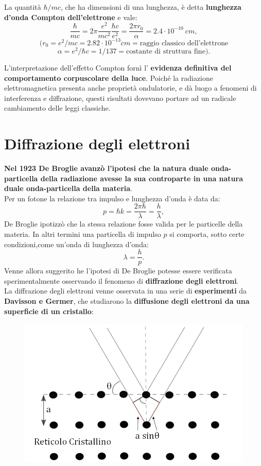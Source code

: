 La quantità $\hbar/ mc$, che ha dimensioni di una lunghezza, è detta \textbf{lunghezza d'onda Compton dell'elettrone} e vale:
\[
\frac{\hbar}{mc}= 2\pi \frac{e^2}{mc^2}\frac{\hbar c}{e^2}= \frac{2\pi r_0}{\alpha}= 2.4 \cdot 10^{-10} \ cm,
\]
\[(r_0 = e^2/mc = 2.82 \cdot 10^{-13} cm = \textrm{raggio classico dell'elettrone}\]
\[\alpha = e^2/\hbar c = 1/137 = \textrm{costante di struttura fine}).\]

L'interpretazione dell'effetto Compton fornì l' \textbf{evidenza definitiva del comportamento corpuscolare della luce}. Poiché la radiazione elettromagnetica presenta anche proprietà ondulatorie, e dà luogo a fenomeni di interferenza e diffrazione, questi risultati dovevano portare ad un radicale cambiamento delle leggi classiche.
\section{Diffrazione degli elettroni}
\textbf{Nel 1923 De Broglie avanzò l'ipotesi che la natura duale onda-particella della radiazione avesse la sua controparte in una natura duale onda-particella della materia}.\\
Per un fotone la relazione tra impulso e lunghezza d'onda è data da:
\begin{equation}
p= \hbar k = \frac{2\pi \hbar}{\lambda}=\frac{h}{\lambda},
\end{equation}
De Broglie ipotizzò che la stessa relazione fosse valida per le particelle della materia. In altri termini una particella di impulso $p$ si comporta, sotto certe condizioni,come un'onda di lunghezza d'onda:
	\begin{equation}
		\boxed{\boxed{
			\lambda=\frac{h}{p}.
			}}
	\end{equation}
Venne allora suggerito he l'ipotesi di De Broglie potesse essere verificata sperimentalmente osservando il fenomeno di \textbf{diffrazione degli elettroni}.\\
La diffrazione degli elettroni venne osservata in una serie di \textbf{esperimenti} da \textbf{Davisson e Germer}, che studiarono la \textbf{diffusione degli elettroni da una superficie di un cristallo}:
	\begin{figure}[!htbp]
		\begin{center}
			\includegraphics[width=.55\textwidth]{immagini/cap_1/fig_1_5.png}
		\end{center}
	\end{figure}

